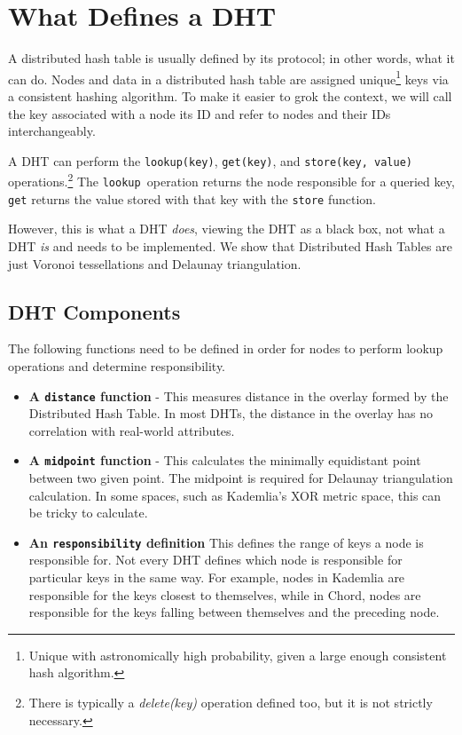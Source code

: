 \documentclass[11pt,conference]{IEEEtran}
\begin{document}
\section{What Defines a DHT}
\label{sec:define}

A distributed hash table is usually defined by its protocol; in other words, what it can do.
Nodes and data in a distributed hash table are assigned unique\footnote{Unique with astronomically high probability, given a large enough consistent hash algorithm.} keys via a consistent hashing algorithm.
To make it easier to grok the context, we will call the key associated with a node its ID and refer to  nodes and their IDs interchangeably.

A DHT can perform the \texttt{lookup(key)}, \texttt{get(key)}, and \texttt{store(key, value)} operations.\footnote{There is typically a \textit{delete(key)} operation defined too, but it is not strictly necessary.}
The \texttt{lookup }operation returns the node responsible for a queried key, \texttt{get} returns the value stored with that key with the \texttt{store} function.

However, this is what a DHT \textit{does}, viewing the DHT as a black box, not what a DHT \textit{is} and needs to be implemented.
We show that Distributed Hash Tables are just Voronoi tessellations and Delaunay triangulation.


\subsection{DHT Components}
The following functions need to be defined in order for nodes to perform lookup operations and determine responsibility.

\begin{itemize}
	\item \textbf{A \texttt{distance} function } - This measures distance in the overlay formed by the Distributed Hash Table.
	In most DHTs, the distance in the overlay has no correlation with real-world attributes.
	
	\item \textbf{A \texttt{midpoint} function} - This calculates the minimally equidistant point between two given point.
	The midpoint is required for Delaunay triangulation calculation.
	In some spaces, such as Kademlia's XOR metric space, this can be tricky to calculate.  %
	\item \textbf{An \texttt{responsibility} definition}  This defines the range of keys a node is responsible for. 
	Not every DHT defines which node is responsible for particular keys in the same way. 
	For example, nodes in Kademlia are responsible for the keys closest to themselves, while in Chord, nodes are responsible for the keys falling between themselves and the preceding node.
\end{itemize}
\end{document}

